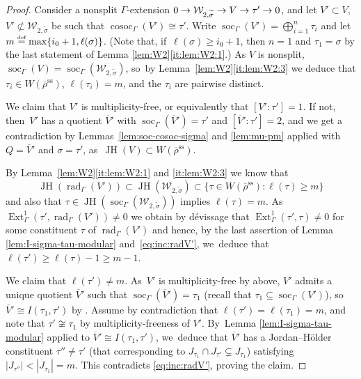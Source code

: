 \documentclass[JEP,XML,SOM,Unicode,NoFloatCountersInSection, NoEqCountersInSection,published]{cedram}
\let\wt\widetilde
\let\ovl\overline
\newcommand{\defeq}{\stackrel{\textrm{\tiny{\upshape{def}}}}{=}}
\renewcommand{\ss}{\mathrm{ss}}
\newcommand{\brho}{\overline{\rho}}
\DeclareMathOperator{\cosoc}{cosoc}
\DeclareMathOperator{\Ext}{Ext}
\DeclareMathOperator{\JH}{\mathrm{JH}}
\DeclareMathOperator{\rad}{rad}
\DeclareMathOperator{\soc}{soc}
\theoremstyle{plain}
\theoremstyle{definition}
\begin{document}
\begin{proof}

Consider a nonsplit $\Gamma$-extension $0\to \mathcal{W}_{2,\wt\sigma}\to V\to \tau'\ra0$, and let $V' \subset V$, $V' \not\subset \mathcal{W}_{2,\wt\sigma}$ be such that $\cosoc_\Gamma(V') \cong \tau'$.
Write $\soc_\Gamma(V') = \bigoplus_{i=1}^n \tau_i$ and let $m \defeq \max\{i_0+1,\ell(\sigma)\}$.
(Note that, if~$\ell(\sigma) \ge i_0+1$, then $n = 1$ and $\tau_1 = \sigma$ by the last statement of Lemma \ref{lem:W2}\eqref{it:lem:W2:1}.)
As $V$ is nonsplit, $\soc_\Gamma(V) = \soc_\Gamma(\mathcal{W}_{2,\wt\sigma})$, so~by Lem\-ma~\ref{lem:W2}\eqref{it:lem:W2:3} we deduce that $\tau_i\in W(\brho^\ss)$, $\ell(\tau_i) = m$, and the $\tau_i$ are pairwise distinct.

We claim that $V'$ is multiplicity-free, or equivalently that $[V':\tau'] = 1$.
If not, then~$V'$ has a quotient $\ovl V'$ with $\soc_\Gamma(\ovl V') = \tau'$ and $[\ovl V':\tau'] = 2$, and we get a contradiction by Lemmas~\ref{lem:soc-cosoc-sigma} and \ref{lem:mu-pm} applied with $Q=\overline
V'$ and $\sigma=\tau'$, as~\hbox{$\JH(V) \subset W(\brho^\ss)$}.

By Lemma~\ref{lem:W2}\eqref{it:lem:W2:1} and \eqref{it:lem:W2:3} we know that
\begin{equation}
\label{eq:inc:radV'}
\JH(\rad_\Gamma(V')) \subset \JH(\mathcal{W}_{2,\wt\sigma}) \subset \{ \tau \in W(\brho^\ss): \ell(\tau) \ge m \}
\end{equation}
and also that $\tau \in \JH(\soc_\Gamma(\mathcal{W}_{2,\wt\sigma}))$ implies $\ell(\tau) = m$. As~$\Ext^1_\Gamma(\tau',\rad_\Gamma(V'))\neq 0$ we obtain by dévissage that $\Ext^1_\Gamma(\tau',\tau)\neq 0$ for some constituent $\tau$ of $\rad_\Gamma(V')$ and hence, by the last assertion of Lemma \ref{lem:I-sigma-tau-modular} and~\eqref{eq:inc:radV'}, we~deduce that $\ell(\tau') \ge \ell(\tau)-1\geq m-1$.

We claim that $\ell(\tau') \neq m$. As~$V'$ is multiplicity-free by above, $V'$ admits a unique quotient $\ovl V'$ such that $\soc_\Gamma(\ovl V') = \tau_1$ (recall that $\tau_1\subseteq \soc_\Gamma(V')$), so~$\ovl V'\cong I(\tau_1,\tau')$ by \cite[Cor.\,3.12]{BP}.
Assume by contradiction that $\ell(\tau')=\ell(\tau_1)=m$, and note that $\tau' \not\cong \tau_1$ by multiplicity-freeness of $V'$. By~Lemma \ref{lem:I-sigma-tau-modular} applied to $\ovl V'\cong I(\tau_1,\tau')$, we~deduce that $\ovl V'$ has a Jordan--Hölder constituent $\tau''\neq \tau'$ (\eg that corresponding to $J_{\tau_1}\cap J_{\tau'}\subsetneq J_{\tau_1}$) satisfying $|J_{\tau''}|<|J_{\tau_1}|=m$.
This contradicts \eqref{eq:inc:radV'}, proving the claim.


\end{proof}
\end{document}
